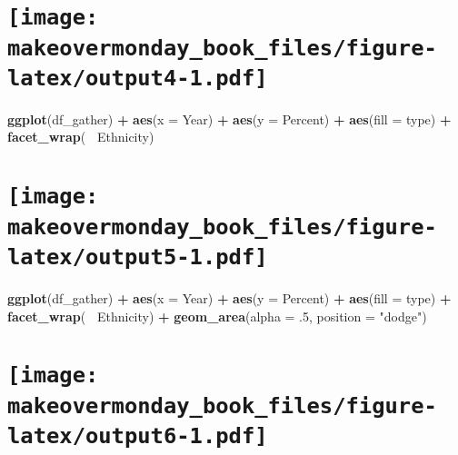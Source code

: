 \documentclass[]{book}
\newenvironment{Shaded}{\begin{snugshade}}{\end{snugshade}}
\newcommand{\KeywordTok}[1]{\textcolor[rgb]{0.13,0.29,0.53}{\textbf{#1}}}
\newcommand{\DataTypeTok}[1]{\textcolor[rgb]{0.13,0.29,0.53}{#1}}
\newcommand{\DecValTok}[1]{\textcolor[rgb]{0.00,0.00,0.81}{#1}}
\newcommand{\StringTok}[1]{\textcolor[rgb]{0.31,0.60,0.02}{#1}}
\newcommand{\OperatorTok}[1]{\textcolor[rgb]{0.81,0.36,0.00}{\textbf{#1}}}
\newcommand{\NormalTok}[1]{#1}
\theoremstyle{definition}
\theoremstyle{definition}
\theoremstyle{definition}
\theoremstyle{remark}
\begin{document}
\section[]{\texorpdfstring{\protect\texttt{[image: makeovermonday\_book\_files/figure-latex/output4-1.pdf]}}{}}\label{section-3}

\clearpage

\begin{Shaded}
\begin{Highlighting}[]
\KeywordTok{ggplot}\NormalTok{(df_gather) }\OperatorTok{+}
\StringTok{  }\KeywordTok{aes}\NormalTok{(}\DataTypeTok{x =}\NormalTok{ Year) }\OperatorTok{+}
\StringTok{  }\KeywordTok{aes}\NormalTok{(}\DataTypeTok{y =}\NormalTok{ Percent) }\OperatorTok{+}
\StringTok{  }\KeywordTok{aes}\NormalTok{(}\DataTypeTok{fill =}\NormalTok{ type) }\OperatorTok{+}
\StringTok{  }\KeywordTok{facet_wrap}\NormalTok{(}\OperatorTok{~}\StringTok{ }\NormalTok{Ethnicity) }
\end{Highlighting}
\end{Shaded}

\section[]{\texorpdfstring{\protect\texttt{[image: makeovermonday\_book\_files/figure-latex/output5-1.pdf]}}{}}\label{section-4}

\clearpage

\begin{Shaded}
\begin{Highlighting}[]
\KeywordTok{ggplot}\NormalTok{(df_gather) }\OperatorTok{+}
\StringTok{  }\KeywordTok{aes}\NormalTok{(}\DataTypeTok{x =}\NormalTok{ Year) }\OperatorTok{+}
\StringTok{  }\KeywordTok{aes}\NormalTok{(}\DataTypeTok{y =}\NormalTok{ Percent) }\OperatorTok{+}
\StringTok{  }\KeywordTok{aes}\NormalTok{(}\DataTypeTok{fill =}\NormalTok{ type) }\OperatorTok{+}
\StringTok{  }\KeywordTok{facet_wrap}\NormalTok{(}\OperatorTok{~}\StringTok{ }\NormalTok{Ethnicity) }\OperatorTok{+}
\StringTok{  }\KeywordTok{geom_area}\NormalTok{(}\DataTypeTok{alpha =}\NormalTok{ .}\DecValTok{5}\NormalTok{, }\DataTypeTok{position =} \StringTok{"dodge"}\NormalTok{) }
\end{Highlighting}
\end{Shaded}

\section[]{\texorpdfstring{\protect\texttt{[image: makeovermonday\_book\_files/figure-latex/output6-1.pdf]}}{}}\label{section-5}
\end{document}
